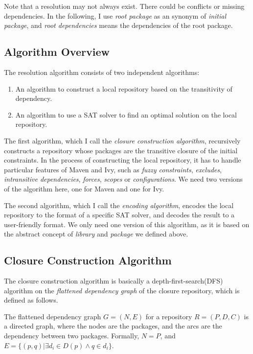 Note that a resolution may not always exist. There could be conflicts or missing dependencies. In the following, I use \emph{root package} as an synonym of \emph{initial package}, and \emph{root dependencies} means the dependencies of the root package.

\subsection{Algorithm Overview}

The resolution algorithm consists of two independent algorithms:

\begin{enumerate}
\item An algorithm to construct a local repository based on the transitivity of dependency.
\item An algorithm to use a SAT solver to find an optimal solution on the local repository.
\end{enumerate}

The first algorithm, which I call the \emph{closure construction algorithm}, recursively constructs a repository whose packages are the transitive closure of the initial constraints. In the process of constructing the local repository, it has to handle particular features of Maven and Ivy, such as \emph{fuzzy constraints}, \emph{excludes}, \emph{intransitive dependencies}, \emph{forces}, \emph{scopes} or \emph{configurations}. We need two versions of the algorithm here, one for Maven and one for Ivy.

The second algorithm, which I call the \emph{encoding algorithm}, encodes the local repository to the format of a specific SAT solver, and decodes the result to a user-friendly format. We only need one version of this algorithm, as it is based on the abstract concept of \emph{library} and \emph{package} we defined above.

\subsection{Closure Construction Algorithm}

The closure construction algorithm is basically a depth-first-search(DFS) algorithm on the \emph{flattened dependency graph} of the closure repository, which is defined as follows.

\begin{definition}
  The flattened dependency graph $G = (N, E)$ for a repository $R = (P, D, C)$ is a directed graph, where the nodes are the packages, and the arcs are the dependency between two packages. Formally, $N = P$, and $E = \{ (p, q) | \exists d_i \in D(p) \land q \in d_i\}$.
\end{definition}

